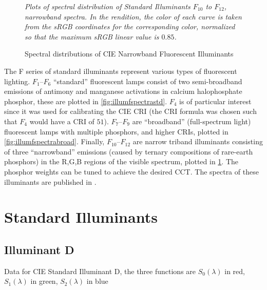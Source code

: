 \begin{figure}
{
\small
\centering

\caption{Spectral distributions of CIE Narrowband Fluorescent Illuminants}
\label{fig:illumfspectranarrow}
}
\vskip 1mm
{\footnotesize\it Plots of spectral distribution of
Standard Illuminants $F_{10}$ to $F_{12}$, narrowband spectra.
In the rendition, the color of each curve is taken from the
sRGB coordinates for the corresponding color,
normalized so that the maximum sRGB linear value is $0.85$.
}
\end{figure}

The F series of standard illuminants represent various types of fluorescent lighting.
$F_1$--$F_6$ ``standard'' fluorescent lamps consist of two semi-broadband
emissions of
antimony and manganese activations in calcium halophosphate phosphor, these are
plotted in \cref{fig:illumfspectrastd}. $F_4$ is of
particular interest since it was used for calibrating the \gls{CIE} \gls{CRI}
(the \gls{CRI} formula was chosen such that $F_4$ would have a \gls{CRI} of
$51$).
$F_7$--$F_9$ are ``broadband'' (full-spectrum light) fluorescent lamps with
multiple phosphors, and higher \glspl{CRI}, plotted in
\cref{fig:illumfspectrabroad}. Finally, $F_{10}$--$F_{12}$ are narrow
triband illuminants consisting of three ``narrowband'' emissions (caused by
ternary
compositions of rare-earth phosphors) in the R,G,B regions of the visible
spectrum, plotted in \cref{fig:illumfspectranarrow}.
The phosphor weights can be tuned to achieve the desired \gls{CCT}.
The spectra of these illuminants are published in \cite{ciecolorimetry}.


\section{Standard Illuminants}\label{ch:stdilldata}

\subsection{Illuminant D}

Data for CIE Standard Illuminant D, the three functions
are $S_0(\lambda)$ in red, $S_1(\lambda)$ in green, $S_2(\lambda)$ in blue

